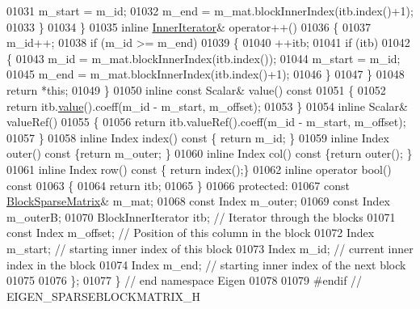 \begin{DoxyCode}
01031           m\_start = m\_id;
01032           m\_end = m\_mat.blockInnerIndex(itb.index()+1);
01033         \}
01034      \}
01035     \textcolor{keyword}{inline} \hyperlink{class_eigen_1_1_inner_iterator}{InnerIterator}& operator++()
01036     \{
01037       m\_id++;
01038       \textcolor{keywordflow}{if} (m\_id >= m\_end)
01039       \{
01040         ++itb;
01041         \textcolor{keywordflow}{if} (itb)
01042         \{
01043           m\_id = m\_mat.blockInnerIndex(itb.index());
01044           m\_start = m\_id;
01045           m\_end = m\_mat.blockInnerIndex(itb.index()+1);
01046         \}
01047       \}
01048       \textcolor{keywordflow}{return} *\textcolor{keyword}{this};
01049     \}
01050     \textcolor{keyword}{inline} \textcolor{keyword}{const} Scalar& value()\textcolor{keyword}{ const}
01051 \textcolor{keyword}{    }\{
01052       \textcolor{keywordflow}{return} itb.\hyperlink{class_eigen_1_1_inner_iterator_ab04bccb41eb22ffcb92dc61125aab119}{value}().coeff(m\_id - m\_start, m\_offset);
01053     \}
01054     \textcolor{keyword}{inline} Scalar& valueRef()
01055     \{
01056       \textcolor{keywordflow}{return} itb.valueRef().coeff(m\_id - m\_start, m\_offset);
01057     \}
01058     \textcolor{keyword}{inline} Index index()\textcolor{keyword}{ const }\{ \textcolor{keywordflow}{return} m\_id; \}
01059     \textcolor{keyword}{inline} Index outer()\textcolor{keyword}{ const }\{\textcolor{keywordflow}{return} m\_outer; \}
01060     \textcolor{keyword}{inline} Index col()\textcolor{keyword}{ const }\{\textcolor{keywordflow}{return} outer(); \}
01061     \textcolor{keyword}{inline} Index row()\textcolor{keyword}{ const }\{ \textcolor{keywordflow}{return} index();\}
01062     \textcolor{keyword}{inline} \textcolor{keyword}{operator} bool()\textcolor{keyword}{ const}
01063 \textcolor{keyword}{    }\{
01064       \textcolor{keywordflow}{return} itb;
01065     \}
01066   \textcolor{keyword}{protected}:
01067     \textcolor{keyword}{const} \hyperlink{group___sparse_core___module_class_eigen_1_1_block_sparse_matrix}{BlockSparseMatrix}& m\_mat;
01068     \textcolor{keyword}{const} Index m\_outer;
01069     \textcolor{keyword}{const} Index m\_outerB;
01070     BlockInnerIterator itb; \textcolor{comment}{// Iterator through the blocks}
01071     \textcolor{keyword}{const} Index m\_offset; \textcolor{comment}{// Position of this column in the block}
01072     Index m\_start; \textcolor{comment}{// starting inner index of this block}
01073     Index m\_id; \textcolor{comment}{// current inner index in the block}
01074     Index m\_end; \textcolor{comment}{// starting inner index of the next block}
01075 
01076 \};
01077 \} \textcolor{comment}{// end namespace Eigen}
01078 
01079 \textcolor{preprocessor}{#endif // EIGEN\_SPARSEBLOCKMATRIX\_H}
\end{DoxyCode}
